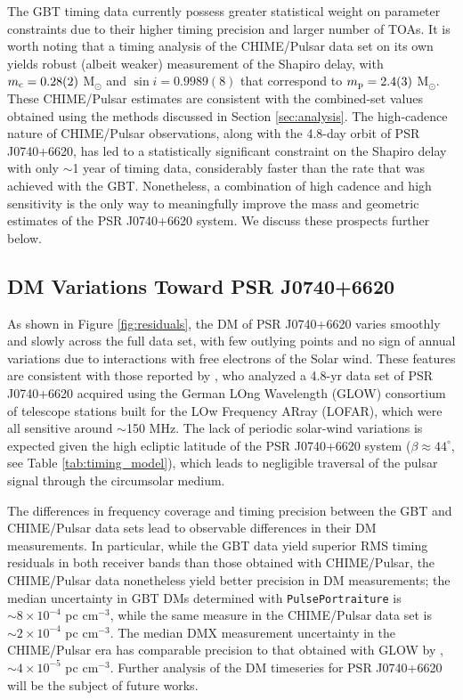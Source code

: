 \documentclass[twocolumn]{aastex63}
\newcommand{\chimepsr}{CHIME/Pulsar}
\newcommand{\pp}{{\tt PulsePortraiture}}
\begin{document}
The GBT timing data currently possess greater statistical weight on parameter constraints due to their higher timing precision and larger number of TOAs. It is worth noting that a timing analysis of the \chimepsr{} data set on its own yields robust (albeit weaker) measurement of the Shapiro delay, with $m_{\rm c} = 0.28(2)$ M$_\odot$ and $\sin i = 0.9989(8)$ that correspond to $m_{\rm p} = 2.4(3)$ M$_\odot$. These CHIME/Pulsar estimates are consistent with the combined-set values obtained using the methods discussed in Section \ref{sec:analysis}. The high-cadence nature of \chimepsr{} observations, along with the 4.8-day orbit of PSR J0740+6620, has led to a statistically significant constraint on the Shapiro delay with only $\sim$1 year of timing data, considerably faster than the rate that was achieved with the GBT. Nonetheless, a combination of high cadence and high sensitivity is the only way to meaningfully improve the mass and geometric estimates of the PSR J0740+6620 system. We discuss these prospects further below.

\subsection{DM Variations Toward PSR J0740+6620}
As shown in Figure \ref{fig:residuals}, the DM of PSR J0740+6620 varies smoothly and slowly across the full data set, with few outlying points and no sign of annual variations due to interactions with free electrons of the Solar wind. These features are consistent with those reported by \citet{dvt+20}, who analyzed a 4.8-yr data set of PSR J0740+6620 acquired using the German LOng Wavelength (GLOW) consortium of telescope stations built for the LOw Frequency ARray (LOFAR), which were all sensitive around $\sim$150 MHz. The lack of periodic solar-wind variations is expected given the high ecliptic latitude of the PSR J0740+6620 system ($\beta \approx 44^\circ$, see Table \ref{tab:timing_model}), which leads to negligible traversal of the pulsar signal through the circumsolar medium.

The differences in frequency coverage and timing precision between the GBT and \chimepsr{} data sets lead to observable differences in their DM measurements. In particular, while the GBT data yield superior RMS timing residuals in both receiver bands than those obtained with \chimepsr, the \chimepsr{} data nonetheless yield better precision in DM measurements; the median uncertainty in GBT DMs determined with \pp{} is $\sim8\times10^{-4}$ pc cm$^{-3}$, while the same measure in the \chimepsr{} data set is $\sim2\times10^{-4}$ pc cm$^{-3}$. The median DMX measurement uncertainty in the \chimepsr{} era has comparable precision to that obtained with GLOW by \citet{dvt+20}, $\sim4\times10^{-5}$ pc cm$^{-3}$. Further analysis of the DM timeseries for PSR J0740+6620 will be the subject of future works.
\end{document}
